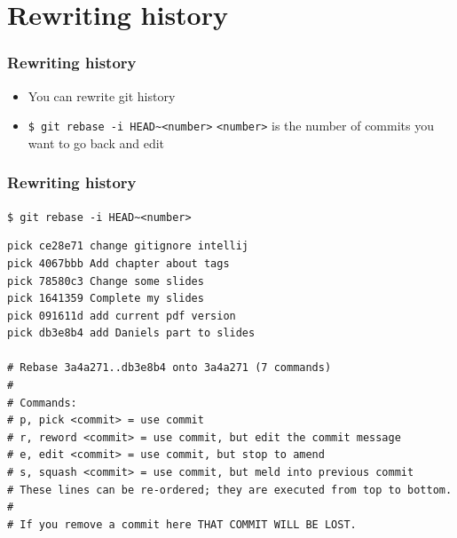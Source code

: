 \documentclass{beamer}
\begin{document}
	\section{Rewriting history}
	\begin{frame}
		\frametitle{Rewriting history}\pause
		\begin{itemize}
			\item You can rewrite git history\pause\newline
			\item \lstinline|$ git rebase -i HEAD~<number>|\newline
			\lstinline|<number>| is the number of commits you want to go back and edit\pause
		\end{itemize}
	\end{frame}
	
	\begin{frame}[fragile]
		\frametitle{Rewriting history}\pause
		\lstinline|$ git rebase -i HEAD~<number>|\newline
		\begin{lstlisting}[basicstyle=\tiny]
pick ce28e71 change gitignore intellij
pick 4067bbb Add chapter about tags
pick 78580c3 Change some slides
pick 1641359 Complete my slides
pick 091611d add current pdf version
pick db3e8b4 add Daniels part to slides

# Rebase 3a4a271..db3e8b4 onto 3a4a271 (7 commands)
#
# Commands:
# p, pick <commit> = use commit
# r, reword <commit> = use commit, but edit the commit message
# e, edit <commit> = use commit, but stop to amend
# s, squash <commit> = use commit, but meld into previous commit
# These lines can be re-ordered; they are executed from top to bottom.                                                           
#
# If you remove a commit here THAT COMMIT WILL BE LOST.
		\end{lstlisting}
	\end{frame}
	
\end{document}
